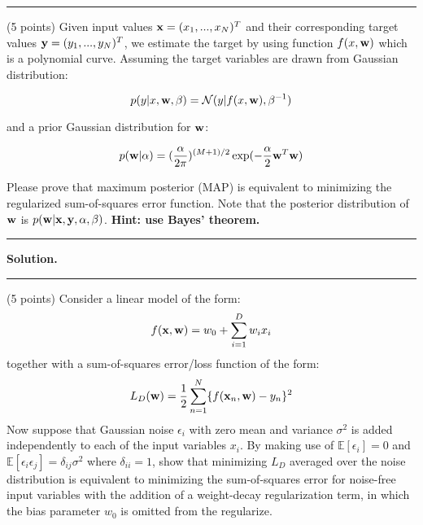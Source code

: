 \documentclass{exam}
\newcommand{\xx}{{\bf{x}}}
\newcommand{\yy}{{\bf{y}}}
\newcommand{\ww}{{\bf{w}}}
\begin{document}
\begin{questions}

\vspace{2mm}\hrule\vspace{2mm}

\newpage
{} (5 points) Given input values $\xx= (x_1,...,x_N)^T$ and their corresponding target values $\yy= (y_1,...,y_N)^T$, we estimate the target by using function $f(x,\ww)$ which is a polynomial curve. Assuming the target variables are drawn from Gaussian distribution:

$$p(y|x, \ww,\beta) = \mathcal{N} (y | f(x,\ww), \beta^{-1})$$

and  a prior Gaussian distribution for $\ww$:

$$p(\ww|\alpha) = (\frac{\alpha}{2\pi})^{(M+1)/2} \exp(-\frac{\alpha}{2} \ww^T\ww)$$

Please prove that maximum posterior (MAP) is equivalent to minimizing the regularized sum-of-squares error function. Note that the posterior distribution of $\ww$ is $p(\ww|\xx,\yy,\alpha,\beta)$. \textbf{Hint: use Bayes' theorem.}

\vspace{2mm}\hrule\vspace{2mm} 

\textbf{Solution.} \\[0.5mm]  






\vspace{2mm}\hrule\vspace{2mm}


\newpage
{} (5 points) Consider a linear model of the form:
$$f(\xx,\ww) = w_0 + \sum_{i=1}^D w_i x_i$$
together with a sum-of-squares error/loss function of the form:
$$L_D(\ww) = \frac{1}{2} \sum_{n=1}^N \{f(\xx_n,\ww) - y_n\}^2$$
Now suppose that Gaussian noise $\epsilon_i$ with zero mean and variance $\sigma^2$ is added independently to each of the input variables $x_i$. By making use of $\mathbb{E}[\epsilon_i]=0$ and $\mathbb{E}[\epsilon_i\epsilon_j]=\delta_{ij} \sigma^2$ where $\delta_{ii}=1$, show that minimizing $L_D$ averaged over the noise distribution is equivalent to minimizing the sum-of-squares error
for noise-free input variables with the addition of a weight-decay regularization term, in which the bias parameter $w_0$ is omitted from the regularize.


\end{questions}
\end{document}
